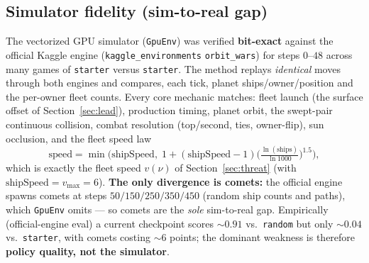 \documentclass[11pt]{article}
\begin{document}
\subsection{Simulator fidelity (sim-to-real gap)}\label{sec:simfidelity}
The vectorized GPU simulator (\texttt{GpuEnv}) was verified \textbf{bit-exact} against the official
Kaggle engine (\texttt{kaggle\_environments} \texttt{orbit\_wars}) for steps $0$--$48$ across many
games of \texttt{starter} versus \texttt{starter}. The method replays \emph{identical} moves through both
engines and compares, each tick, planet ships/owner/position and the per-owner fleet counts. Every core
mechanic matches: fleet launch (the surface offset of Section~\ref{sec:lead}), production timing, planet
orbit, the swept-pair continuous collision, combat resolution (top/second, ties, owner-flip), sun
occlusion, and the fleet speed law
\begin{equation}
\text{speed} = \min\!\Big(\text{shipSpeed},\;
  1 + (\text{shipSpeed}-1)\big(\tfrac{\ln(\text{ships})}{\ln 1000}\big)^{1.5}\Big),
\label{eq:speedlaw}
\end{equation}
which is exactly the fleet speed $v(\nu)$ of Section~\ref{sec:threat} (with $\text{shipSpeed}=v_{\max}=6$).
\textbf{The only divergence is comets:}
the official engine spawns comets at steps $50/150/250/350/450$ (random ship counts and paths), which
\texttt{GpuEnv} omits --- so comets are the \emph{sole} sim-to-real gap. Empirically (official-engine
eval) a current checkpoint scores ${\sim}0.91$ vs.\ \texttt{random} but only ${\sim}0.04$ vs.\
\texttt{starter}, with comets costing ${\sim}6$ points; the dominant weakness is therefore \textbf{policy
quality, not the simulator}.

\end{document}
